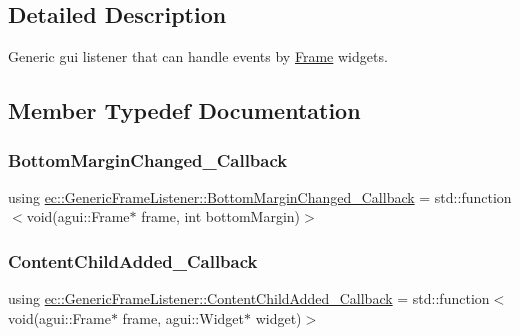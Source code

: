 \subsection{Detailed Description}
Generic gui listener that can handle events by \mbox{\hyperlink{classec_1_1_frame}{Frame}} widgets. 

\subsection{Member Typedef Documentation}
\mbox{\label{classec_1_1_generic_frame_listener_aadeca32c32883e7951bd27b6a9a9d06a}} 
\subsubsection{\texorpdfstring{Bottom\+Margin\+Changed\+\_\+\+Callback}{BottomMarginChanged\_Callback}}
{\footnotesize\ttfamily using \mbox{\hyperlink{classec_1_1_generic_frame_listener_aadeca32c32883e7951bd27b6a9a9d06a}{ec\+::\+Generic\+Frame\+Listener\+::\+Bottom\+Margin\+Changed\+\_\+\+Callback}} =  std\+::function$<$void(agui\+::\+Frame$\ast$ frame, int bottom\+Margin)$>$}

\mbox{\label{classec_1_1_generic_frame_listener_a60609130cab4035d4dd9315cca67e7e9}} 
\subsubsection{\texorpdfstring{Content\+Child\+Added\+\_\+\+Callback}{ContentChildAdded\_Callback}}
{\footnotesize\ttfamily using \mbox{\hyperlink{classec_1_1_generic_frame_listener_a60609130cab4035d4dd9315cca67e7e9}{ec\+::\+Generic\+Frame\+Listener\+::\+Content\+Child\+Added\+\_\+\+Callback}} =  std\+::function$<$void(agui\+::\+Frame$\ast$ frame, agui\+::\+Widget$\ast$ widget)$>$}

